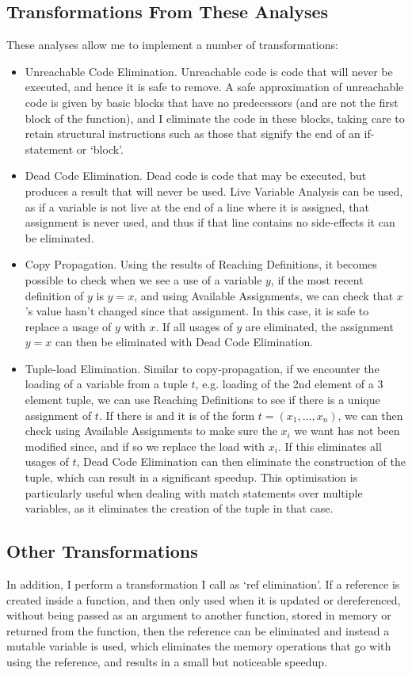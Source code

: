 \documentclass[12pt,twoside,notitlepage]{report}
\begin{document}
\subsection{Transformations From These Analyses}
These analyses allow me to implement a number of transformations:
\begin{itemize}
	\item Unreachable Code Elimination. Unreachable code is code that will never be executed, and hence it is safe to remove. A safe approximation of unreachable code is given by basic blocks that have no predecessors (and are not the first block of the function), and I eliminate the code in these blocks, taking care to retain structural instructions such as those that signify the end of an if-statement or `block'.
	\item Dead Code Elimination. Dead code is code that may be executed, but produces a result that will never be used. Live Variable Analysis can be used, as if a variable is not live at the end of a line where it is assigned, that assignment is never used, and thus if that line contains no side-effects it can be eliminated.
	\item Copy Propagation. Using the results of Reaching Definitions, it becomes possible to check when we see a use of a variable $y$, if the most recent definition of $y$ is $y = x$, and using Available Assignments, we can check that $x$'s value hasn't changed since that assignment. In this case, it is safe to replace a usage of $y$ with $x$. If all usages of $y$ are eliminated, the assignment $y = x$ can then be eliminated with Dead Code Elimination.
	\item Tuple-load Elimination. Similar to copy-propagation, if we encounter the loading of a variable from a tuple $t$, e.g. loading of the 2nd element of a 3 element tuple, we can use Reaching Definitions to see if there is a unique assignment of $t$. If there is and it is of the form $t = (x_1, ..., x_n)$, we can then check using Available Assignments to make sure the $x_i$ we want has not been modified since, and if so we replace the load with $x_i$. If this eliminates all usages of $t$, Dead Code Elimination can then eliminate the construction of the tuple, which can result in a significant speedup. This optimisation is particularly useful when dealing with match statements over multiple variables, as it eliminates the creation of the tuple in that case.
\end{itemize}

\subsection{Other Transformations}
In addition, I perform a transformation I call as `ref elimination'. If a reference is created inside a function, and then only used when it is updated or dereferenced, without being passed as an argument to another function, stored in memory or returned from the function, then the reference can be eliminated and instead a mutable variable is used, which eliminates the memory operations that go with using the reference, and results in a small but noticeable speedup.
\end{document}
